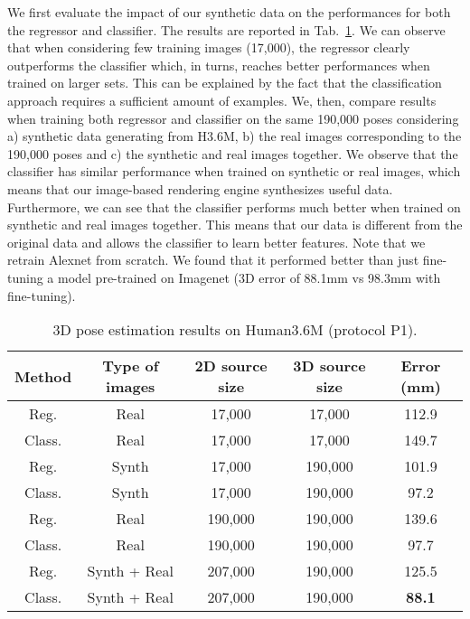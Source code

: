 \documentclass{article}
\begin{document}
We first evaluate the impact of our synthetic data on the performances
for both the regressor and classifier. The results are reported in
Tab.~\ref{tab:H36M}. We can observe that when considering few training
images (17,000), the regressor clearly outperforms the classifier
which, in turns, reaches better performances when trained on larger
sets. This can be explained by  
the fact that the classification approach requires a sufficient amount of examples.
 We, then, compare results when training both regressor and classifier
 on the same 190,000 poses considering a) synthetic data generating
 from H3.6M, b) the real images corresponding to the 190,000 poses and
 c) the synthetic and real images together. We observe that the
 classifier has similar performance when trained on synthetic or
 real images, which means that our image-based rendering engine
 synthesizes useful data. Furthermore, we can see that the classifier
 performs much better  when trained on synthetic and real images
 together. This means that our data  is different from
 the original data and allows the classifier to learn better
 features. Note that we retrain Alexnet from scratch. We found that it performed better than just fine-tuning a model pre-trained on Imagenet (3D error of 88.1mm vs 98.3mm with fine-tuning).
  \begin{table} 
\caption{3D pose estimation results on Human3.6M (protocol P1).}
\vspace{-2mm}\centering
\begin{tabular}{c|c|c|c|c }
Method & Type  of images & 2D source size    & 3D source size & Error (mm)  \\  
\hline 
Reg. & Real &  17,000 &  17,000  & 112.9   \\ 
Class. & Real &    17,000 &  17,000  &149.7   \\ 
\hline
Reg. & Synth &  17,000 & 190,000  & 101.9 \\ 
Class. & Synth &  17,000   & 190,000 &  97.2    \\ 
\hline
Reg. & Real & 190,000   & 190,000  &139.6    \\ 
Class. & Real & 190,000   & 190,000  &97.7  \\ 
\hline
Reg. & Synth + Real &  207,000 & 190,000 &125.5  \\ 
Class. & Synth + Real & 207,000  & 190,000 &\bf{88.1}   \\ 
\end{tabular} 
\label{tab:H36M}
\end{table}
\end{document}
